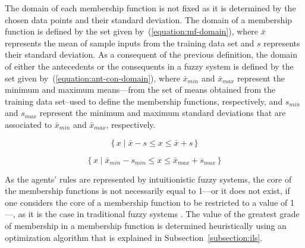 ﻿\documentclass{ieeeaccess}
\begin{document}

The domain of each membership function is not fixed as it is
determined by the chosen data points and their standard deviation. The
domain of a membership function is defined by the set given
by~(\ref{equation:mf-domain}), where $\bar{x}$ represents the mean of
sample inputs from the training data set and $s$ represents their
standard deviation. As a consequent of the previous definition, the
domain of either the antecedents or the consequents in a fuzzy system
is defined by the set given by~(\ref{equation:ant-con-domain}), where
$\bar{x}_{min}$ and $\bar{x}_{max}$ represent the minimum and maximum
means---from the set of means obtained from the training data
set--used to define the membership functions, respectively, and
$s_{min}$ and $s_{max}$ represent the minimum and maximum standard
deviations that are associated to $\bar{x}_{min}$ and $\bar{x}_{max}$,
respectively. %


\begin{equation}
  \label{equation:mf-domain}
  \{\,x \mid \bar{x} - s \leq x \leq \bar{x} + s \,\}
\end{equation}

\begin{equation}
  \label{equation:ant-con-domain}
  \{\,x \mid \bar{x}_{min} - s_{min} \leq x \leq \bar{x}_{max} + s_{max} \,\}
\end{equation}

As the agents' rules are represented by intuitionistic fuzzy systems, the core of
the membership functions is not necessarily equal to 1---or it does not exist,
if one considers the core of a membership function to be restricted to a value
of 1---, as it is the case in traditional fuzzy systems \cite{wygralak2000axiomatic}. %
The value of the greatest
grade of membership in a membership function is determined heuristically using
an optimization algorithm that is explained in
Subsection~\ref{subsection:ils}.
\end{document}
